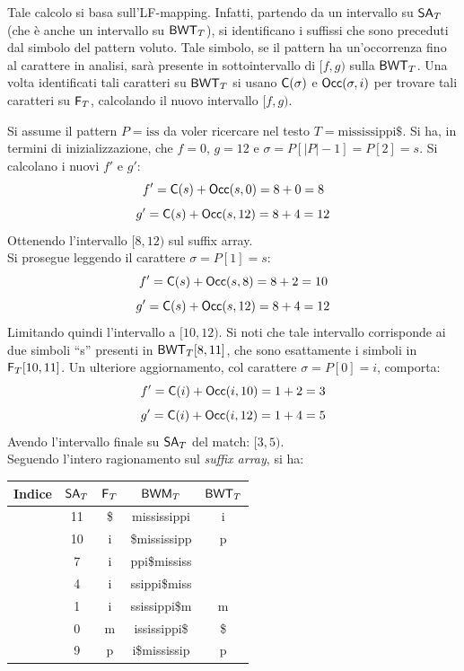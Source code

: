 Tale calcolo si basa sull'LF-mapping. Infatti, partendo da un
intervallo su $\mbox{\rm {\sf SA}}_T$ (che è anche un intervallo su $\mbox{\rm {\sf BWT}}_T$), si identificano
i suffissi che sono preceduti dal simbolo del pattern voluto. Tale simbolo, se
il 
pattern ha un'occorrenza fino al carattere in analisi, sarà presente in
sottointervallo di $[f,g)$ sulla $\mbox{\rm {\sf BWT}}_T$. Una volta identificati tali caratteri
su $\mbox{\rm {\sf BWT}}_T$ si usano $\mbox{\rm {\sf C}}(\sigma)$ e $\mbox{\rm {\sf Occ}}(\sigma, i)$ per trovare tali
caratteri su $\mbox{\rm {\sf F}}_T$, calcolando il nuovo intervallo $[f,g)$.
\begin{esempio}
  Si assume il pattern $P=\mbox{iss}$ da voler ricercare nel testo
  $T=\mbox{mississippi\$}$. 
  Si ha, in termini di inizializzazione, che $f=0$, $g=12$ e
  $\sigma=P[|P|-1]=P[2]=s$. Si calcolano i nuovi $f'$ e $g'$:
  \[f'=\mbox{\rm {\sf C}}(s)+\mbox{\rm {\sf Occ}}(s, 0)=8+0=8\]
  \[g'=\mbox{\rm {\sf C}}(s)+\mbox{\rm {\sf Occ}}(s, 12)=8+4=12\]
  Ottenendo l'intervallo $[8,12)$ sul suffix array.\\
  Si prosegue leggendo il carattere $\sigma=P[1]=s$:
  \[f'=\mbox{\rm {\sf C}}(s)+\mbox{\rm {\sf Occ}}(s, 8)=8+2=10\]
  \[g'=\mbox{\rm {\sf C}}(s)+\mbox{\rm {\sf Occ}}(s, 12)=8+4=12\]
  Limitando quindi l'intervallo a $[10,12)$. Si noti che tale intervallo
  corrisponde ai due simboli ``s'' presenti in $\mbox{\rm {\sf BWT}}_T[8,11]$, che sono
  esattamente i simboli in $\mbox{\rm {\sf F}}_T[10,11]$.
  Un ulteriore aggiornamento, col carattere $\sigma=P[0]=i$, comporta:
  \[f'=\mbox{\rm {\sf C}}(i)+\mbox{\rm {\sf Occ}}(i, 10)=1+2=3\]
  \[g'=\mbox{\rm {\sf C}}(i)+\mbox{\rm {\sf Occ}}(i, 12)=1+4=5\]
  Avendo l'intervallo finale su $\mbox{\rm {\sf SA}}_T$ del match: $[3,5)$.\\
  Seguendo l'intero ragionamento sul \textit{suffix array}, si ha:
  \begin{table}[H]
    \centering
    \scriptsize
    \begin{tabular}{c|c|c|c|c} 
      \textbf{Indice} & $\mbox{\rm {\sf SA}}_T$ & $\mbox{\rm {\sf F}}_T$ & $\mbox{\rm {\sf BWM}}_T$
      & $\mbox{\rm {\sf BWT}}_T$\\ 
      \hline
      {\color{nordred}{0}} & 11 & \$ & {\color{nordred}{\$}}mississippi & i\\
      {\color{nordred}{1}} & 10 & i & {\color{nordred}{i}}\$mississipp & p\\
      {\color{nordred}{2}} & 7 & i & {\color{nordred}{i}}ppi\$mississ
      & {\color{nordgreen}{s}}\\
      {\color{nordred}{3}} & 4 & i & {\color{nordred}{i}}ssippi\$miss
      & {\color{nordgreen}{s}}\\
      {\color{nordred}{4}} & 1 & i & {\color{nordred}{i}}ssissippi\$m & m\\
      {\color{nordred}{5}} & 0 & m & {\color{nordred}{m}}ississippi\$ & \$\\
      {\color{nordred}{6}} & 9 & p & {\color{nordred}{p}}i\$mississip & p\\

\end{tabular}
\end{table}
\end{esempio}
